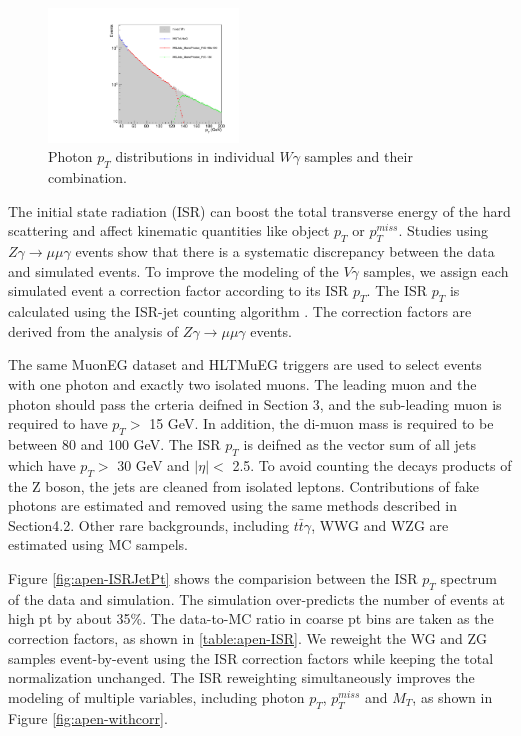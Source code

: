 \documentclass[thesis.tex]{subfiles}
\renewcommand\_{\textunderscore\allowbreak}
\begin{document}
\begin{figure}[!hbt]
  \centering
    \includegraphics[width=0.45\textwidth]{Figures/WGMixing.pdf}
  \caption{Photon $p_T$ distributions in individual $W\gamma$ samples and their combination.}
    \label{fig:mixWG}
\end{figure}

The initial state radiation (ISR) can boost the total transverse energy of the hard scattering and affect kinematic quantities like object $p_T$ or $p_T^{miss}$. Studies using $Z\gamma\rightarrow\mu\mu\gamma$ events show that there is a systematic discrepancy between the data and simulated events. To improve the modeling of the $V\gamma$ samples, we assign each simulated event a correction factor according to its ISR $p_T$. The ISR $p_T$ is calculated using the ISR-jet counting algorithm \cite{ISR-JET-ALGO}. The correction factors are derived from the analysis of $Z\gamma\rightarrow \mu\mu\gamma$ events.

The same MuonEG dataset and HLT\_MuEG triggers are used to select events with one photon and exactly two isolated muons.  The leading muon and the photon should pass the crteria deifned in Section 3, and the sub-leading muon is required to have $p_T >$ 15 GeV. In addition, the di-muon mass is required to be between 80 and 100 GeV. The ISR $p_T$ is deifned as the vector sum of all jets which have $p_T >$ 30 GeV and $|\eta| <$ 2.5.  To avoid counting the decays products of the Z boson, the jets are cleaned from isolated leptons. Contributions of fake photons are estimated and removed using the same methods described in  Section4.2.  Other rare backgrounds, including $t\bar{t}\gamma$, WWG and WZG are estimated using MC sampels.

Figure \ref{fig:apen-ISRJetPt} shows the comparision between the ISR $p_T$ spectrum of the data and simulation. The simulation over-predicts the number of events at high pt by about 35\%. The data-to-MC ratio in coarse pt bins are taken as the correction factors, as shown in \ref{table:apen-ISR}. We reweight the WG and ZG samples event-by-event using the ISR correction factors while keeping the total normalization unchanged. The ISR reweighting simultaneously improves the modeling of multiple variables, including photon $p_T$, $p_T^{miss}$ and $M_T$, as shown in Figure \ref{fig:apen-withcorr}.
\end{document}
